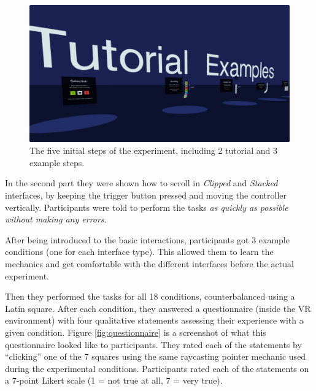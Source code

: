 \documentclass[nobib]{tufte-book} %
\begin{document}
\begin{figure}[h]
  \includegraphics[width=\linewidth]{tutorials.png}
  \caption{The five initial steps of the experiment, including 2 tutorial and 3 example steps.}
  \label{fig:tutorials}
\end{figure}

In the second part they were shown how to scroll in \emph{Clipped} and \emph{Stacked} interfaces, by keeping the trigger button pressed and moving the controller vertically.
Participants were told to perform the tasks \emph{as quickly as possible without making any errors}.

After being introduced to the basic interactions, participants got 3 example conditions (one for each interface type). This allowed them to learn the mechanics and get comfortable with the different interfaces before the actual experiment.

Then they performed the tasks for all 18 conditions, counterbalanced using a Latin square. After each condition, they answered a questionnaire (inside the VR environment) with four qualitative statements assessing their experience with a given condition. Figure \ref{fig:questionnaire} is a screenshot of what this questionnaire looked like to participants. They rated each of the statements by ``clicking'' one of the 7 squares using the same raycasting pointer mechanic used during the experimental conditions. Participants rated each of the statements on a 7-point Likert scale (1 = not true at all, 7 = very true).
\end{document}
